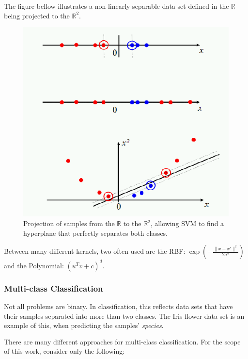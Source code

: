\documentclass[12pt]{article}
\begin{document}
The figure bellow illustrates a non-linearly separable data set defined in the $\mathbb{R}$ being projected to the $\mathbb{R}^2$.

\begin{figure}[H]
	\centering
	\captionsetup{justification=centering}

	\includegraphics[scale=.4]{svm_kernel}
	\caption{Projection of samples from the $\mathbb{R}$ to the $\mathbb{R}^2$, allowing SVM to find a hyperplane that perfectly separates both classes. \cite{svmkernels}}
	\label{fig:svmkernel}
\end{figure}

Between many different kernels, two often used are the RBF: $\exp(-\frac{\|x -x'\|^2}{2\sigma^2})$ and the Polynomial: $(u^T v + c)^{d}$. \cite{svmkernels}

\subsubsection{Multi-class Classification}

Not all problems are binary. In classification, this reflects data sets that have their samples separated into more than two classes. The Iris flower data set is an example of this, when predicting the samples' {\em species}.

There are many different approaches for multi-class classification. \cite{rif2008} For the scope of this work, consider only the following:
\end{document}
